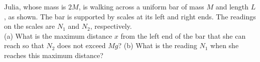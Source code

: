 Julia, whose mass is $2M$, is walking across a uniform bar of mass $M$ and length $L$,
as shown. The bar is supported by scales at its left and right
ends. The readings on the scales are $N_1$ and $N_2$,
respectively.\\
%
(a) What is the maximum distance $x$ from the left end of the bar
that she can reach so that $N_2$ does not exceed $Mg$?\answercheck\hwendpart
%
(b) What is the reading $N_1$ when she reaches this maximum distance?\answercheck
